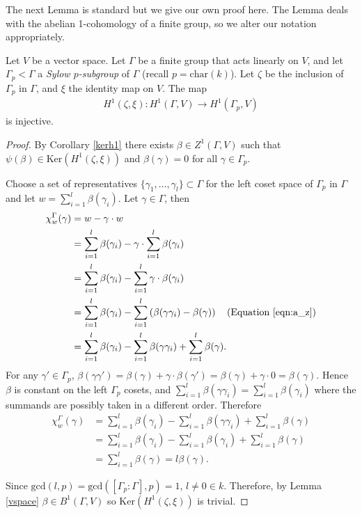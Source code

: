 The next Lemma is standard \cite[Theorem 10.3]{brown1976cohomology} but we give our own proof here. The Lemma deals with the abelian 1-cohomology of a finite group, so we alter our notation appropriately.

\begin{lemma} \label{brown}
Let $V$ be a vector space. Let $\Gamma$ be a finite group that acts linearly on $V$, and let $\Gamma_p < \Gamma$ a \emph{Sylow $p$-subgroup} of $\Gamma$ (recall $p = \mathrm{char}(k)$). Let $\zeta$ be the inclusion of $\Gamma_p$ in $\Gamma$, and $\xi$ the identity map on $V$. The map 
\begin{align*}
H^1(\zeta, \xi):H^1(\Gamma, V)\rightarrow H^1(\Gamma_p, V)
\end{align*}
is injective.
\label{lem:a_h_restriction}
\end{lemma}
\begin{proof}
	By Corollary \ref{kerh1} there exists $\beta \in Z^1(\Gamma, V)$ such that $\psi(\beta) \in \mathrm{Ker}\left(H^1(\zeta, \xi)\right)$ and $\beta(\gamma) = 0$ for all $\gamma \in \Gamma_p$.
	
	Choose a set of representatives $\{\gamma_1, \ldots, \gamma_l\} \subset \Gamma$ for the left coset space of $\Gamma_p$ in $\Gamma$ and let $w = \sum_{i =1}^l \beta(\gamma_i)$.
Let $\gamma \in \Gamma$, then
\begin{align*}
	\chi_{w}^\Gamma(\gamma) &=  w - \gamma\cdot w \\
	&=  \sum_{i = 1}^l\beta(\gamma_i) - \gamma\cdot \sum_{i = 1}^l\beta(\gamma_i) \\
	&=  \sum_{i = 1}^l\beta(\gamma_i) - \sum_{i = 1}^l \gamma\cdot \beta(\gamma_i) \\
	&=  \sum_{i = 1}^l\beta(\gamma_i) - \sum_{i = 1}^l \left(\beta(\gamma\gamma_i) - \beta(\gamma) \right) \quad(\textrm{Equation }\ref{eqn:a_z})\\
	&=  \sum_{i = 1}^l\beta(\gamma_i) - \sum_{i = 1}^l \beta(\gamma\gamma_i) +\sum_{i = 1}^l \beta(\gamma).
\end{align*}
For any $\gamma' \in \Gamma_p$, $\beta(\gamma \gamma') = \beta(\gamma) + \gamma \cdot \beta(\gamma') = \beta(\gamma) +\gamma \cdot 0 = \beta(\gamma)$. Hence $\beta$ is constant on the left $\Gamma_p$ cosets, and $\sum_{i = 1}^l \beta(\gamma\gamma_i) = \sum_{i = 1}^l \beta(\gamma_i)$ where the summands are possibly taken in a different order. Therefore
\begin{align*}
	\chi_{w}^\Gamma(\gamma)
	&=  \sum_{i = 1}^l\beta(\gamma_i) - \sum_{i = 1}^l \beta(\gamma\gamma_i) +\sum_{i = 1}^l \beta(\gamma) \\
	&=  \sum_{i = 1}^l\beta(\gamma_i) - \sum_{i = 1}^l \beta(\gamma_i) +\sum_{i = 1}^l \beta(\gamma) \\
	&=  \sum_{i = 1}^l \beta(\gamma) = l\beta(\gamma).
\end{align*}

Since $\mathrm{gcd}(l, p) = \mathrm{gcd}\left([\Gamma_p:\Gamma], p\right) = 1$, $l \neq 0 \in k$. Therefore, by Lemma \ref{vspace} $\beta \in B^1(\Gamma, V)$ so $\mathrm{Ker}\left(H^1(\zeta, \xi)\right)$ is trivial.
\end{proof}

